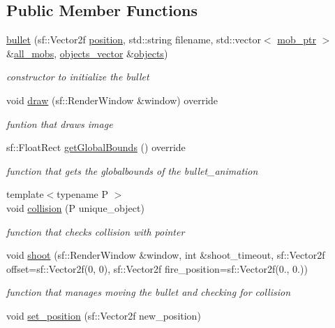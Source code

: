 \subsection*{Public Member Functions}
\begin{DoxyCompactItemize}
\item 
\hyperlink{classbullet_a2c8b1e868ab8fe8edf43fc289f8d80b8}{bullet} (sf\+::\+Vector2f \hyperlink{classdrawable_a34679fa5ae82eee65dfd6b1b9f3c7cb6}{position}, std\+::string filename, std\+::vector$<$ \hyperlink{npc_8hpp_a09ee7f853fc9bc830a9445a06fd53d4b}{mob\+\_\+ptr} $>$ \&\hyperlink{classbullet_a8730572b757fc9d664fb3ce640a797ce}{all\+\_\+mobs}, \hyperlink{drawable_8hpp_a6c0fdb1dfd0c34dbbdbb5dcd3c608b07}{objects\+\_\+vector} \&\hyperlink{classbullet_a93b79bed80ce59b86e3fd332d0c03c5c}{objects})
\begin{DoxyCompactList}\small\item\em constructor to initialize the bullet \end{DoxyCompactList}\item 
void \hyperlink{classbullet_ae999b952538687d45ca2ae54164a5cd8}{draw} (sf\+::\+Render\+Window \&window) override
\begin{DoxyCompactList}\small\item\em funtion that draws image \end{DoxyCompactList}\item 
sf\+::\+Float\+Rect \hyperlink{classbullet_a87bda5887249e8e37c5579180449bd93}{get\+Global\+Bounds} () override
\begin{DoxyCompactList}\small\item\em function that gets the globalbounds of the bullet\+\_\+animation \end{DoxyCompactList}\item 
{\footnotesize template$<$typename P $>$ }\\void \hyperlink{classbullet_ab7e5c677bbd642df24a2251bb58249b7}{collision} (P unique\+\_\+object)
\begin{DoxyCompactList}\small\item\em function that checks collision with pointer \end{DoxyCompactList}\item 
void \hyperlink{classbullet_a52d736cad2a486a65c8a25781cff1f70}{shoot} (sf\+::\+Render\+Window \&window, int \&shoot\+\_\+timeout, sf\+::\+Vector2f offset=sf\+::\+Vector2f(0, 0), sf\+::\+Vector2f fire\+\_\+position=sf\+::\+Vector2f(0., 0.))
\begin{DoxyCompactList}\small\item\em function that manages moving the bullet and checking for collision \end{DoxyCompactList}\item 
void \hyperlink{classbullet_af338da31bfb1dd4b2d942ca67316350a}{set\+\_\+position} (sf\+::\+Vector2f new\+\_\+position)
\end{DoxyCompactItemize}
